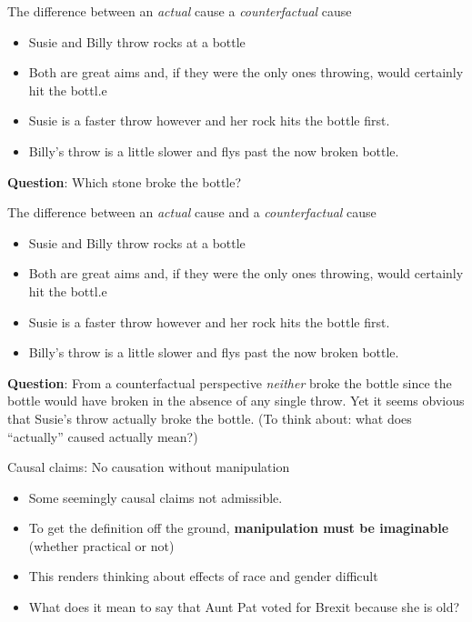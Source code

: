\documentclass[11pt,ignorenonframetext,]{beamer}
\providecommand{\tightlist}{%
  \setlength{\itemsep}{0pt}\setlength{\parskip}{0pt}}
\begin{document}
\begin{frame}{The difference between an \emph{actual} cause a
\emph{counterfactual} cause}

\begin{itemize}
\tightlist
\item
  Susie and Billy throw rocks at a bottle
\item
  Both are great aims and, if they were the only ones throwing, would
  certainly hit the bottl.e
\item
  Susie is a faster throw however and her rock hits the bottle first.
\item
  Billy's throw is a little slower and flys past the now broken bottle.
\end{itemize}

\textbf{Question}: Which stone broke the bottle?

\end{frame}

\begin{frame}{The difference between an \emph{actual} cause and a
\emph{counterfactual} cause}

\begin{itemize}
\tightlist
\item
  Susie and Billy throw rocks at a bottle
\item
  Both are great aims and, if they were the only ones throwing, would
  certainly hit the bottl.e
\item
  Susie is a faster throw however and her rock hits the bottle first.
\item
  Billy's throw is a little slower and flys past the now broken bottle.
\end{itemize}

\textbf{Question}: From a counterfactual perspective \emph{neither}
broke the bottle since the bottle would have broken in the absence of
any single throw. Yet it seems obvious that Susie's throw actually broke
the bottle. (To think about: what does ``actually'' caused actually
mean?)

\end{frame}

\begin{frame}{Causal claims: No causation without manipulation}

\begin{itemize}
\tightlist
\item
  Some seemingly causal claims not admissible.
\item
  To get the definition off the ground, \textbf{manipulation must be
  imaginable} (whether practical or not)
\item
  This renders thinking about effects of race and gender difficult
\item
  What does it mean to say that Aunt Pat voted for Brexit because she is
  old?
\end{itemize}

\end{frame}
\end{document}
